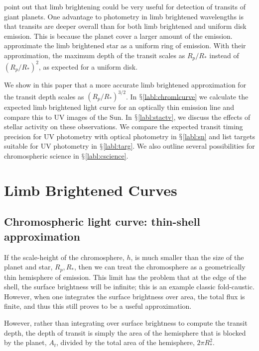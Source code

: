 \documentclass[manuscript]{aastex}
\begin{document}
\citet{assef} point out that limb brightening could be
very useful for detection of transits of giant planets. One advantage
to photometry in limb brightened wavelengths is that transits are
deeper overall than for both limb brightened and uniform disk
emission. This is because the planet cover a larger amount of the
emission. \citet{assef} approximate the limb brightened
star as a uniform ring of emission. With their approximation, the maximum depth
of the transit scales as $R_p/R_*$ instead of $(R_p/R_*)^2$,
as expected for a uniform disk.

We show in this paper that a more accurate limb brightened
approximation for the transit depth scales as $(R_p/R_*)^{3/2}$. In
$\mathsection$\ref{labl:chromlcurve} we calculate the expected limb
brightened light curve for an optically thin emission line and compare
this to UV images of the Sun. In $\mathsection$\ref{labl:stactv}, we
discuss the effects of stellar activity on these observations. We
compare the expected transit timing precision for UV photometry with
optical photometry in $\mathsection$\ref{labl:sn} and list targets
suitable for UV photometry in $\mathsection$\ref{labl:targ}. We also
outline several possibilities for chromospheric science in
$\mathsection$\ref{labl:cscience}.

\section{Limb Brightened Curves}

\subsection{Chromospheric light curve: thin-shell approximation}
\label{labl:thinshell}

If the scale-height of the chromosphere, $h$, is much smaller than
the size of the planet and star, $R_p, R_*$, then we can
treat the chromosphere as a geometrically thin hemisphere of emission.
This limit has the problem that at the edge of the shell, the surface
brightness will be infinite; this is an example classic fold-caustic.
However, when one integrates the surface brightness over area, the
total flux is finite, and thus this still proves to be a useful
approximation.

However, rather than integrating over surface brightness to compute
the transit depth, the depth of transit is simply the area of the 
hemisphere that is blocked by the planet, $A_t$, divided by the total
area of the hemisphere, $2\pi R_*^2$.
\end{document}
